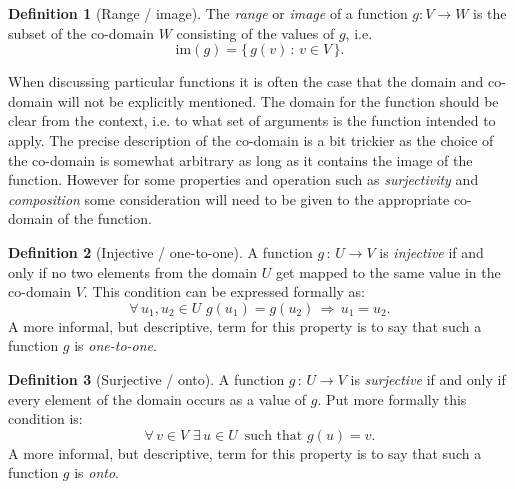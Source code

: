 \documentclass[extrafontsizes, twoside, a4paper]{memoir}
\theoremstyle{plain}%
\theoremstyle{definition}
\newtheorem{defn}{Definition}[chapter]
\theoremstyle{remark}
\begin{document}
\begin{defn}[Range / image]
The \emph{range} or \emph{image} of a function $g: V \to W$ is the subset of the co-domain $W$ consisting of the values of $g$, i.e.
$$\text{im}(g) = \{ \, g(v) \, : \, v \in V \, \} .$$
\end{defn}


When discussing particular functions it is often the case that the domain and co-domain will not be explicitly mentioned. The domain for the function should be clear from the context, i.e. to what set of arguments is the function intended to apply. The precise description of the co-domain is a bit trickier as the choice of the co-domain is somewhat arbitrary as long as it contains the image of the function. However for some properties and operation such as \textit{surjectivity} and \textit{composition} some consideration will need to be given to the appropriate co-domain of the function.

\begin{defn}[Injective / one-to-one]
A function $g \, : \, U \to V$ is \emph{injective} if and only if no two elements from the domain $U$ get mapped to the same value in the co-domain $V$. This condition can be expressed formally as:
$$ \forall \, u_1, u_2 \in U \, \, g(u_1) = g(u_2) \, \Rightarrow \, u_1 = u_2 .$$
A more informal, but descriptive, term for this property is to say that such a function $g$ is \emph{one-to-one}.
\end{defn}

\begin{defn}[Surjective / onto]
A function $g \, : \, U \to V$ is \emph{surjective} if and only if every element of the domain occurs as a value of $g$. Put more formally this condition is:
$$ \forall \, v \in V \, \, \exists \, u \in U \, \text{ such that } g(u)=v .$$
A more informal, but descriptive, term for this property is to say that such a function $g$ is \emph{onto}.
\end{defn}
\end{document}
